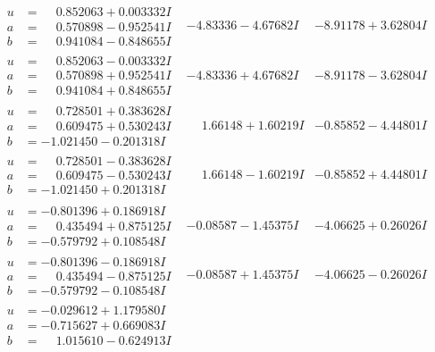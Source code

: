 \documentclass[1p]{elsarticle_modified}
\theoremstyle{definition}
\begin{document}
$$\begin{array}{c|c|c}
\begin{aligned}
u &= \phantom{-}0.852063 + 0.003332 I \\
a &= \phantom{-}0.570898 - 0.952541 I \\
b &= \phantom{-}0.941084 - 0.848655 I\end{aligned}
 & -4.83336 - 4.67682 I & -8.91178 + 3.62804 I \\ \hline\begin{aligned}
u &= \phantom{-}0.852063 - 0.003332 I \\
a &= \phantom{-}0.570898 + 0.952541 I \\
b &= \phantom{-}0.941084 + 0.848655 I\end{aligned}
 & -4.83336 + 4.67682 I & -8.91178 - 3.62804 I \\ \hline\begin{aligned}
u &= \phantom{-}0.728501 + 0.383628 I \\
a &= \phantom{-}0.609475 + 0.530243 I \\
b &= -1.021450 - 0.201318 I\end{aligned}
 & \phantom{-}1.66148 + 1.60219 I & -0.85852 - 4.44801 I \\ \hline\begin{aligned}
u &= \phantom{-}0.728501 - 0.383628 I \\
a &= \phantom{-}0.609475 - 0.530243 I \\
b &= -1.021450 + 0.201318 I\end{aligned}
 & \phantom{-}1.66148 - 1.60219 I & -0.85852 + 4.44801 I \\ \hline\begin{aligned}
u &= -0.801396 + 0.186918 I \\
a &= \phantom{-}0.435494 + 0.875125 I \\
b &= -0.579792 + 0.108548 I\end{aligned}
 & -0.08587 - 1.45375 I & -4.06625 + 0.26026 I \\ \hline\begin{aligned}
u &= -0.801396 - 0.186918 I \\
a &= \phantom{-}0.435494 - 0.875125 I \\
b &= -0.579792 - 0.108548 I\end{aligned}
 & -0.08587 + 1.45375 I & -4.06625 - 0.26026 I \\ \hline\begin{aligned}
u &= -0.029612 + 1.179580 I \\
a &= -0.715627 + 0.669083 I \\
b &= \phantom{-}1.015610 - 0.624913 I\end{aligned}

\end{array}$$
\end{document}
